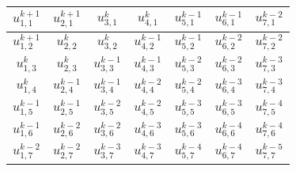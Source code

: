 \documentclass[german,notes,18pt]{beamer}
\begin{document}
\begin{frame}
		\begin{figure}
			\color{black}
			\tiny
			\centering
			\renewcommand*{\arraystretch}{3.6}
			\begin{tabular}{|c|c|c|c|c|c|c|}
				\hline
				\cellcolor{cbblack}$u^{k+1}_{1,1}$ & \cellcolor{cbwhite}$u^{k+1}_{2,1}$ & \cellcolor{cbblack}$u^{k}_{3,1}$ & \cellcolor{cbwhite}$u^{k}_{4,1}$ & \cellcolor{cbblack}$u^{k-1}_{5,1}$ & \cellcolor{cbwhite}$u^{k-1}_{6,1}$ & \cellcolor{cbblack}$u^{k-2}_{7,1}$ \\
				\hline
				\cellcolor{cbwhite}$u^{k+1}_{1,2}$ & \cellcolor{cbblack}$u^{k}_{2,2}$ & \cellcolor{cbwhite}$u^{k}_{3,2}$ & \cellcolor{cbblack}$u^{k-1}_{4,2}$ & \cellcolor{cbwhite}$u^{k-1}_{5,2}$ & \cellcolor{cbblack}$u^{k-2}_{6,2}$ & \cellcolor{cbwhite}$u^{k-2}_{7,2}$ \\
				\hline
				\cellcolor{cbblack}$u^{k}_{1,3}$ & \cellcolor{cbwhite}$u^{k}_{2,3}$ & \cellcolor{cbblack}$u^{k-1}_{3,3}$ & \cellcolor{cbwhite}$u^{k-1}_{4,3}$ & \cellcolor{cbblack}$u^{k-2}_{5,3}$ & \cellcolor{cbwhite}$u^{k-2}_{6,3}$ & \cellcolor{cbblack}$u^{k-3}_{7,3}$ \\
				\hline
				\cellcolor{cbwhite}$u^{k}_{1,4}$ & \cellcolor{cbblack}$u^{k-1}_{2,4}$ & \cellcolor{cbwhite}$u^{k-1}_{3,4}$ & \cellcolor{cbblack}$u^{k-2}_{4,4}$ & \cellcolor{cbwhite}$u^{k-2}_{5,4}$ & \cellcolor{cbblack}$u^{k-3}_{6,4}$ & \cellcolor{cbwhite}$u^{k-3}_{7,4}$ \\
				\hline
				\cellcolor{cbblack}$u^{k-1}_{1,5}$ & \cellcolor{cbwhite}$u^{k-1}_{2,5}$ & \cellcolor{cbblack}$u^{k-2}_{3,5}$ & \cellcolor{cbwhite}$u^{k-2}_{4,5}$ & \cellcolor{cbblack}$u^{k-3}_{5,5}$ & \cellcolor{cbwhite}$u^{k-3}_{6,5}$ & \cellcolor{cbblack}$u^{k-4}_{7,5}$ \\
				\hline
				\cellcolor{cbwhite}$u^{k-1}_{1,6}$ & \cellcolor{cbblack}$u^{k-2}_{2,6}$ & \cellcolor{cbwhite}$u^{k-2}_{3,6}$ & \cellcolor{cbblack}$u^{k-3}_{4,6}$ & \cellcolor{cbwhite}$u^{k-3}_{5,6}$ & \cellcolor{cbblack}$u^{k-4}_{6,6}$ & \cellcolor{cbwhite}$u^{k-4}_{7,6}$ \\
				\hline
				\cellcolor{cbblack}$u^{k-2}_{1,7}$ & \cellcolor{cbwhite}$u^{k-2}_{2,7}$ & \cellcolor{cbblack}$u^{k-3}_{3,7}$ & \cellcolor{cbwhite}$u^{k-3}_{4,7}$ & \cellcolor{cbblack}$u^{k-4}_{5,7}$ & \cellcolor{cbwhite}$u^{k-4}_{6,7}$ & \cellcolor{cbblack}$u^{k-5}_{7,7}$ \\
				\hline
			\end{tabular}
		\end{figure}
	\end{frame}
\end{document}
